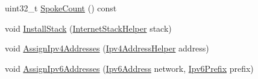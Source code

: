 \begin{DoxyCompactItemize}
\item 
uint32\+\_\+t \hyperlink{classns3_1_1CsmaStarHelper_a7ccfd14dbf0f23306bc80d6e09b91253}{Spoke\+Count} () const 
\item 
void \hyperlink{classns3_1_1CsmaStarHelper_a1c20e681fd513df7ef617936fd0d9e1e}{Install\+Stack} (\hyperlink{classns3_1_1InternetStackHelper}{Internet\+Stack\+Helper} stack)
\item 
void \hyperlink{classns3_1_1CsmaStarHelper_a79de8a790d22696c51a4f6691cf24ce0}{Assign\+Ipv4\+Addresses} (\hyperlink{classns3_1_1Ipv4AddressHelper}{Ipv4\+Address\+Helper} address)
\item 
void \hyperlink{classns3_1_1CsmaStarHelper_a0ff467c2d76ed22673aa7b16e319ab7b}{Assign\+Ipv6\+Addresses} (\hyperlink{classns3_1_1Ipv6Address}{Ipv6\+Address} network, \hyperlink{classns3_1_1Ipv6Prefix}{Ipv6\+Prefix} prefix)
\end{DoxyCompactItemize}
